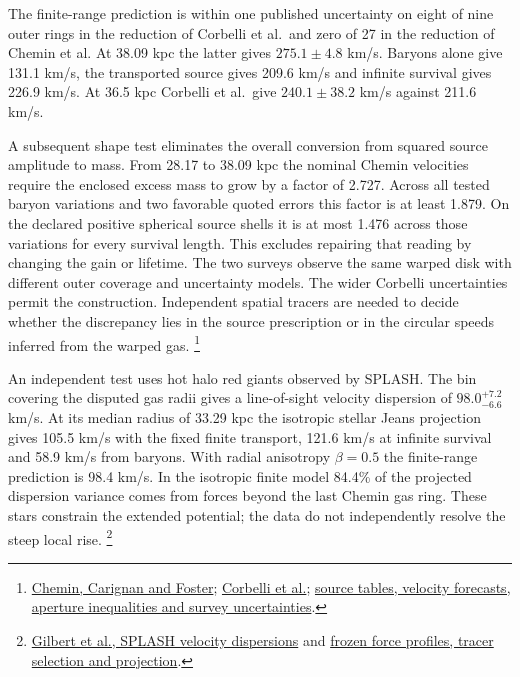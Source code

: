 \documentclass[11pt]{article}
\begin{document}
The finite-range prediction is within one published uncertainty on eight
of nine outer rings in the reduction of Corbelli et al.\ and zero of 27 in
the reduction of Chemin et al. At 38.09 kpc the latter gives
$275.1\pm4.8$ km/s. Baryons alone give 131.1 km/s, the transported
source gives 209.6 km/s and infinite survival gives 226.9 km/s.
At 36.5 kpc Corbelli et al.\ give $240.1\pm38.2$ km/s against 211.6 km/s.

A subsequent shape test eliminates the overall conversion from squared
source amplitude to mass. From 28.17 to 38.09 kpc the nominal Chemin
velocities require the enclosed excess mass to grow by a factor of 2.727.
Across all tested baryon variations and two favorable quoted errors this
factor is at least 1.879. On the declared positive spherical source shells
it is at most 1.476 across those variations for every survival length.
This excludes repairing that reading by changing the gain or lifetime.
The two surveys observe the same warped disk with different outer
coverage and uncertainty models. The wider Corbelli uncertainties
permit the construction. Independent spatial tracers are needed to
decide whether the discrepancy lies in the source prescription or in
the circular speeds inferred from the warped gas.%
\footnote{\href{https://arxiv.org/abs/0909.3846}{Chemin, Carignan and Foster};
\href{https://arxiv.org/abs/0912.4133}{Corbelli et al.};
\href{https://github.com/FloatingPragma/observer-patch-holography/tree/main/code/cosmology/rar_deep_regime/m31_transport}{source tables, velocity forecasts, aperture inequalities and survey uncertainties}.}

An independent test uses hot halo red giants observed by SPLASH.
The bin covering the disputed gas radii gives a line-of-sight velocity
dispersion of $98.0^{+7.2}_{-6.6}$ km/s. At its median radius of
33.29 kpc the isotropic stellar Jeans projection gives 105.5 km/s
with the fixed finite transport, 121.6 km/s at infinite survival and
58.9 km/s from baryons. With radial anisotropy $\beta=0.5$ the
finite-range prediction is 98.4 km/s. In the isotropic finite model
84.4\% of the projected dispersion variance comes from forces beyond
the last Chemin gas ring. These stars constrain the extended potential;
the data do not independently resolve the steep local rise.%
\footnote{\href{https://arxiv.org/abs/1711.02700}{Gilbert et al., SPLASH
velocity dispersions} and
\href{https://github.com/FloatingPragma/observer-patch-holography/tree/main/code/cosmology/rar_deep_regime/m31_transport}{frozen force profiles, tracer selection and projection}.}
\end{document}
